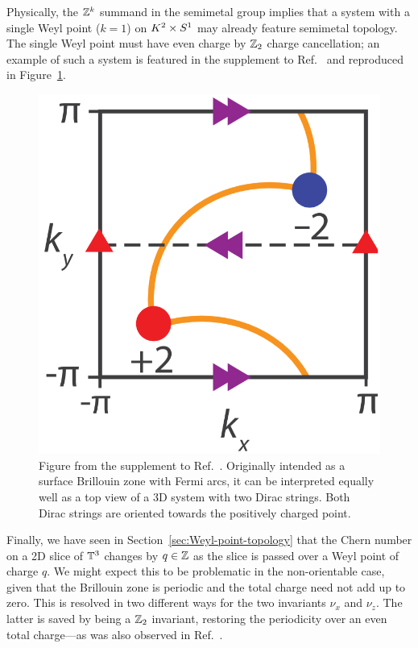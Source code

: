 Physically, the $\mathbb{Z}^k$ summand in the semimetal group implies that a system with a single Weyl point ($k=1$) on $K^2\times S^1$ may already feature semimetal topology. The single Weyl point must have even charge by $\mathbb{Z}_2$ charge cancellation; an example of such a system is featured in the supplement to Ref.~\cite{Fonseca-Vaidya_nonorientable} and reproduced in Figure~\ref{fig:double-points}.
\begin{figure}[htb!]
	\centering
	\includegraphics[width=.4\linewidth]{Images/double-points}
	\caption{Figure from the supplement to Ref.~\cite{Fonseca-Vaidya_nonorientable}. Originally intended as a surface Brillouin zone with Fermi arcs, it can be interpreted equally well as a top view of a 3D system with two Dirac strings. Both Dirac strings are oriented towards the positively charged point.} %
	\label{fig:double-points}
\end{figure}

Finally, we have seen in Section~\ref{sec:Weyl-point-topology} that the Chern number on a 2D slice of $\mathbb{T}^3$ changes by $q\in\mathbb{Z}$ as the slice is passed over a Weyl point of charge $q$. We might expect this to be problematic in the non-orientable case, given that the Brillouin zone is periodic and the total charge need not add up to zero. This is resolved in two different ways for the two invariants $\nu_x$ and $\nu_z$. The latter is saved by being a $\mathbb{Z}_2$ invariant, restoring the periodicity over an even total charge---as was also observed in Ref.~\cite{Fonseca-Vaidya_nonorientable}.

